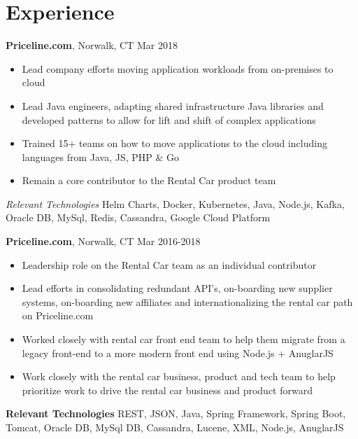 \documentclass[a4paper,online]{adcv}
\begin{document}
\section{Experience}
\begin{adcvtabletwo}
  {\textbf{Priceline.com}, Norwalk, CT}
   {Mar 2018}
  \begin{itemize}
    \item Lead company efforts moving application workloads from on-premises to cloud
    \item Lead Java engineers, adapting shared infrastructure Java libraries and developed patterns to allow for lift and shift of complex applications
    \item Trained 15+ teams on how to move applications to the cloud including languages from Java, JS, PHP \& Go
    \item Remain a core contributor to the Rental Car product team
  \end{itemize}
  \adcvrowskip
  \emph{Relevant Technologies} Helm Charts, Docker, Kubernetes, Java, Node.js, Kafka, Oracle DB, MySql, Redis, Cassandra, Google Cloud Platform

  \adcvrowskip
  {\textbf{Priceline.com}, Norwalk, CT}
   {Mar 2016-2018}
  \begin{itemize}
    \item Leadership role on the Rental Car team as an individual contributor
    \item Lead efforts in consolidating redundant API's, on-boarding new supplier systems, on-boarding new affiliates and internationalizing the rental car path on Priceline.com
    \item Worked closely with rental car front end team to help them migrate from a legacy front-end to a more modern front end using Node.js + AnuglarJS
    \item Work closely with the rental car business, product and tech team to help prioritize work to drive the rental car business and product forward
  \end{itemize}
  \adcvrowskip
  \textbf{Relevant Technologies} REST, JSON, Java, Spring Framework, Spring Boot, Tomcat, Oracle DB, MySql DB, Cassandra, Lucene, XML, Node.js, AnuglarJS


\end{adcvtabletwo}
\end{document}
